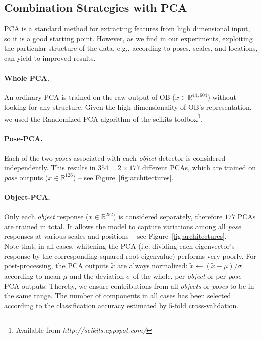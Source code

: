 \documentclass[runningheads,a4paper]{llncs}
\begin{document}
\subsection{Combination Strategies with PCA}

PCA is a standard method for extracting features from high dimensional input, so 
it is a good starting point. However, as we find in our experiments, exploiting
the particular structure of the data, e.g., according to poses, scales, and
locations, can yield to improved results.

\vspace{-0.2cm}
\paragraph{Whole PCA.}
An ordinary PCA is trained on the raw output of OB ($x \in\mathbb{R}^{44,604}$)
without looking for any structure.  Given the high-dimensionality of OB's
representation, we used the Randomized PCA algorithm of the
scikits toolbox\footnote{Available from \textit{http://scikits.appspot.com/}}.


\vspace{-0.2cm} \paragraph{Pose-PCA.} Each of the two \textit{poses} associated
with each \textit{object} detector is considered independently.  This results
in $354=2\times 177$ different PCAs, which  are trained on \textit{pose}
outputs ($x\in\mathbb{R}^{126}$) -- see Figure~\ref{fig:architectures}. 

\vspace{-0.2cm}
\paragraph{Object-PCA.}
Only each \textit{object} response ($x \in\mathbb{R}^{252}$) is considered
separately, therefore $177$ PCAs are trained in total.  It allows the model to
capture variations among all \textit{pose} responses at various scales and
positions -- see Figure~\ref{fig:architectures}.\\ 


Note that, in all cases,  whitening the PCA (i.e. dividing each eigenvector's
response by the corresponding squared root eigenvalue) performs very poorly.
For post-processing, the PCA outputs $\tilde{x}$ are always normalized:
$\tilde{x}\leftarrow (\tilde{x}-\mu)/\sigma $ according to mean $\mu$ and the
deviation $\sigma$ of the whole, per \textit{object} or per \textit{pose} PCA
outputs. Thereby, we ensure contributions from all \textit{objects} or
\textit{poses} to be in the same range.  The number of components in all cases
has been selected according to the classification accuracy estimated by
$5$-fold cross-validation.
\end{document}
